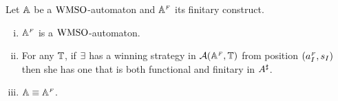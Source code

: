 \begin{theorem}
\label{PROP_facts_finConstrwmso} 
Let $\mathbb{A}$ be a $\mathrm{WMSO}$-automaton and $\mathbb{A}^{{\scriptscriptstyle F}}$ its finitary construct.
\begin{enumerate}[(i)]
   pt
  \item $\mathbb{A}^{{\scriptscriptstyle F}}$ is a $\mathrm{WMSO}$-automaton.\label{point:finConstrAut}
  \item For any $\mathbb{T}$, if $\exists$ has a winning strategy in 
  $\mathcal{A}(\mathbb{A}^{{\scriptscriptstyle F}},\mathbb{T})$ from position $(a_I^{{\scriptscriptstyle F}},s_I)$ then she has one 
  that is both functional and finitary in $A^{\sharp}$.%
  \label{point:finConstrStrategy}
  \item $\mathbb{A} \equiv \mathbb{A}^{{\scriptscriptstyle F}}$. \label{point:finConstrEquiv}
  \end{enumerate}
\end{theorem}
